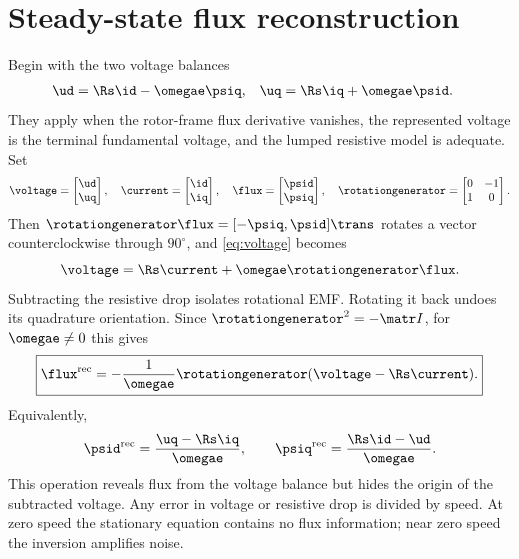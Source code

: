 \section{Steady-state flux reconstruction}
Begin with the two voltage balances
\begin{align}
 \ud&=\Rs\id-\omegae\psiq, &
 \uq&=\Rs\iq+\omegae\psid.\label{eq:voltage}
\end{align}
They apply when the rotor-frame flux derivative vanishes, the represented
voltage is the terminal fundamental voltage, and the lumped resistive model
is adequate. Set
\begin{equation}
 \voltage=\begin{bmatrix}\ud\\\uq\end{bmatrix},\quad
 \current=\begin{bmatrix}\id\\\iq\end{bmatrix},\quad
 \flux=\begin{bmatrix}\psid\\\psiq\end{bmatrix},\quad
 \rotationgenerator=\begin{bmatrix}0&-1\\1&0\end{bmatrix}.
\end{equation}
Then $\rotationgenerator\flux=[-\psiq,\psid]\trans$ rotates a vector counterclockwise
through $90^\circ$, and \cref{eq:voltage} becomes
\begin{equation}
 \voltage=\Rs\current+\omegae\rotationgenerator\flux.\label{eq:vector-voltage}
\end{equation}
Subtracting the resistive drop isolates rotational EMF. Rotating it back
undoes its quadrature orientation. Since $\rotationgenerator^2=-\matr I$, for
$\omegae\ne0$ this gives
\begin{equation}
 \boxed{\flux^{\rm rec}=-\frac{1}{\omegae}\rotationgenerator
 (\voltage-\Rs\current).}\label{eq:reconstruction}
\end{equation}
Equivalently,
\begin{equation}
 \psid^{\rm rec}=\frac{\uq-\Rs\iq}{\omegae},\qquad
 \psiq^{\rm rec}=\frac{\Rs\id-\ud}{\omegae}.
\end{equation}
This operation reveals flux from the voltage balance but hides the origin of
the subtracted voltage. Any error in voltage or resistive drop is divided by
speed. At zero speed the stationary equation contains no flux information;
near zero speed the inversion amplifies noise.

